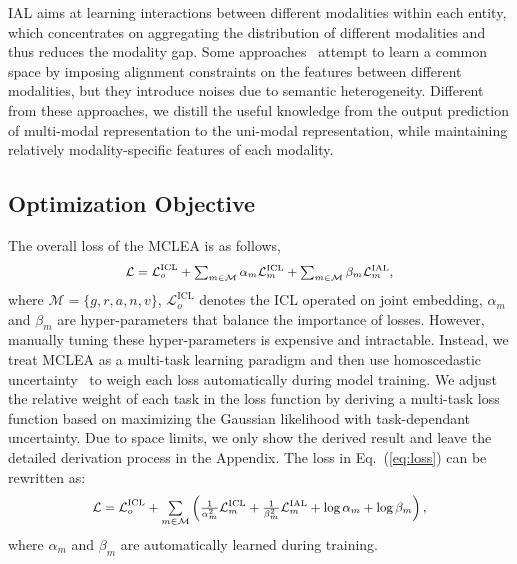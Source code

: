 \documentclass[11pt]{article}
\begin{document}
IAL aims at learning interactions between different modalities within each entity, which concentrates on aggregating the distribution of different modalities and thus reduces the modality gap.
Some approaches~\cite{zhang2019multi,chen2020mmea} attempt to learn a common space by imposing alignment constraints on the features between different modalities, but they introduce noises due to semantic heterogeneity. 
Different from these approaches, we distill the useful knowledge from the output prediction of multi-modal representation to the uni-modal representation, while maintaining relatively modality-specific features of each modality.


\subsection{Optimization Objective}
\label{sec:objective}
The overall loss of the MCLEA is as follows,
\begin{equation}
\begin{small}
\begin{aligned}
    \mathcal{L} = \mathcal{L}^{\text{ICL}}_o + 
    \textstyle\sum_{m\in\mathcal{M}} \alpha_m\mathcal{L}^{\text{ICL}}_m + 
    \textstyle\sum_{m\in\mathcal{M}} \beta_m\mathcal{L}^{\text{IAL}}_m,
    \label{eq:loss}
\end{aligned}
\end{small}
\end{equation}
where $\mathcal{M}=\{g,r,a,n,v\}$, $\mathcal{L}^{\text{ICL}}_o$ denotes the ICL operated on joint embedding, $\alpha_m$ and $\beta_m$ are hyper-parameters that balance the importance of losses.
However, manually tuning these hyper-parameters is expensive and intractable.
Instead, we treat MCLEA as a multi-task learning paradigm and then use homoscedastic uncertainty~\cite{kendall2018multi} to weigh each loss automatically during model training.
We adjust the relative weight of each task in the loss function by deriving a multi-task loss function based on maximizing the Gaussian likelihood with task-dependant uncertainty.
Due to space limits, we only show the derived result and leave the detailed derivation process in the Appendix. The loss in Eq.~(\ref{eq:loss}) can be rewritten as:
\begin{equation}
\begin{small}
\begin{aligned}
    \mathcal{L} 
    = \mathcal{L}^{\text{ICL}}_o + 
    \textstyle\sum\limits_{m\in\mathcal{M}} 
    \left(\frac{1}{\alpha^2_m}\mathcal{L}^{\text{ICL}}_m + 
    \frac{1}{\beta^2_m}\mathcal{L}^{\text{IAL}}_m + 
    \log{\alpha_m} + \log{\beta_m}\right),
    \label{eq:loss2}
\end{aligned}
\end{small}
\end{equation}
where $\alpha_m$ and $\beta_m$ are automatically learned during training.
\end{document}
